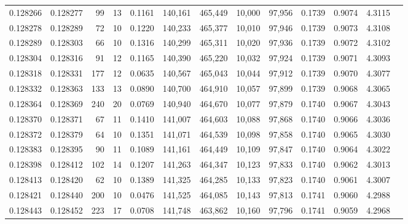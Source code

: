 \begin{tabular}{rrrrrrrrrrrrr}
0.128266 & 0.128277 &    99 &  13 &                                     0.1161 & 140,161 & 465,449 &  10,000 &  97,956 & 0.1739 & 0.9074 & 4.3115 \\
0.128278 & 0.128289 &    72 &  10 &                                     0.1220 & 140,233 & 465,377 &  10,010 &  97,946 & 0.1739 & 0.9073 & 4.3108 \\
0.128289 & 0.128303 &    66 &  10 &                                     0.1316 & 140,299 & 465,311 &  10,020 &  97,936 & 0.1739 & 0.9072 & 4.3102 \\
0.128304 & 0.128316 &    91 &  12 &                                     0.1165 & 140,390 & 465,220 &  10,032 &  97,924 & 0.1739 & 0.9071 & 4.3093 \\
0.128318 & 0.128331 &   177 &  12 &                                     0.0635 & 140,567 & 465,043 &  10,044 &  97,912 & 0.1739 & 0.9070 & 4.3077 \\
0.128332 & 0.128363 &   133 &  13 &                                     0.0890 & 140,700 & 464,910 &  10,057 &  97,899 & 0.1739 & 0.9068 & 4.3065 \\
0.128364 & 0.128369 &   240 &  20 &                                     0.0769 & 140,940 & 464,670 &  10,077 &  97,879 & 0.1740 & 0.9067 & 4.3043 \\
0.128370 & 0.128371 &    67 &  11 &                                     0.1410 & 141,007 & 464,603 &  10,088 &  97,868 & 0.1740 & 0.9066 & 4.3036 \\
0.128372 & 0.128379 &    64 &  10 &                                     0.1351 & 141,071 & 464,539 &  10,098 &  97,858 & 0.1740 & 0.9065 & 4.3030 \\
0.128383 & 0.128395 &    90 &  11 &                                     0.1089 & 141,161 & 464,449 &  10,109 &  97,847 & 0.1740 & 0.9064 & 4.3022 \\
0.128398 & 0.128412 &   102 &  14 &                                     0.1207 & 141,263 & 464,347 &  10,123 &  97,833 & 0.1740 & 0.9062 & 4.3013 \\
0.128413 & 0.128420 &    62 &  10 &                                     0.1389 & 141,325 & 464,285 &  10,133 &  97,823 & 0.1740 & 0.9061 & 4.3007 \\
0.128421 & 0.128440 &   200 &  10 &                                     0.0476 & 141,525 & 464,085 &  10,143 &  97,813 & 0.1741 & 0.9060 & 4.2988 \\
0.128443 & 0.128452 &   223 &  17 &                                     0.0708 & 141,748 & 463,862 &  10,160 &  97,796 & 0.1741 & 0.9059 & 4.2968 \\

\end{tabular}
